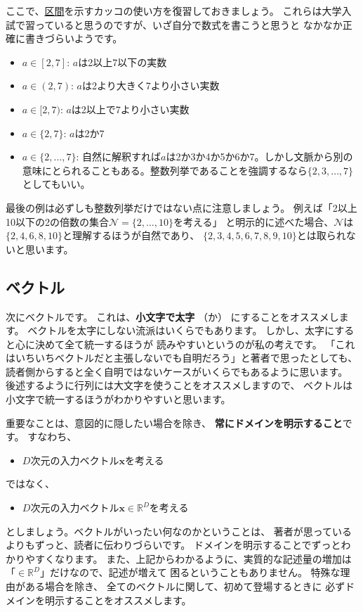 \documentclass[uplatex,twocolumn,9pt,dvipdfmx]{jsarticle}
\begin{document}
ここで、\href{https://en.wikipedia.org/wiki/Interval_(mathematics)}{区間}を示すカッコの使い方を復習しておきましょう。
これらは大学入試で習っていると思うのですが、いざ自分で数式を書こうと思うと
なかなか正確に書きづらいようです。
\begin{itemize}
    \item $a \in [2, 7]$: $a$は2以上7以下の実数
    \item $a \in (2, 7)$: $a$は2より大きく7より小さい実数
    \item $a \in [2, 7)$: $a$は2以上で7より小さい実数
    \item $a \in \{2, 7\}$: $a$は2か7
    \item $a \in \{2, \dots, 7\}$: 自然に解釈すれば$a$は2か3か4か5か6か7。しかし文脈から別の意味にとられることもある。整数列挙であることを強調するなら$\{2, 3, \dots, 7\}$としてもいい。
\end{itemize}
最後の例は必ずしも整数列挙だけではない点に注意しましょう。
例えば「2以上10以下の2の倍数の集合$\mathcal{N}=\{2, \dots, 10\}$を考える」
と明示的に述べた場合、$\mathcal{N}$は$\{2, 4, 6, 8, 10\}$と理解するほうが自然であり、
$\{2, 3, 4, 5, 6, 7, 8, 9, 10\}$とは取られないと思います。

\subsection{ベクトル}
次にベクトルです。
これは、\textbf{小文字で太字}
（\texttt{\mathbf}か\texttt{\bm}）
にすることをオススメします。
ベクトルを太字にしない流派はいくらでもあります。
しかし、太字にすると心に決めて全て統一するほうが
読みやすいというのが私の考えです。
「これはいちいちベクトルだと主張しないでも自明だろう」と著者で思ったとしても、
読者側からすると全く自明ではないケースがいくらでもあるように思います。
後述するように行列には大文字を使うことをオススメしますので、
ベクトルは小文字で統一するほうがわかりやすいと思います。

重要なことは、意図的に隠したい場合を除き、
\textbf{常にドメインを明示すること}です。
すなわち、
\begin{itemize}
\item $D$次元の入力ベクトル$\mathbf{x}$を考える
\end{itemize}
ではなく、
\begin{itemize}
\item $D$次元の入力ベクトル$\mathbf{x}\in\mathbb{R}^D$を考える
\end{itemize}
としましょう。ベクトルがいったい何なのかということは、
著者が思っているよりもずっと、読者に伝わりづらいです。
ドメインを明示することでずっとわかりやすくなります。
また、上記からわかるように、実質的な記述量の増加は
「$\in\mathbb{R}^D$」だけなので、記述が増えて
困るということもありません。
特殊な理由がある場合を除き、
全てのベクトルに関して、初めて登場するときに
必ずドメインを明示することをオススメします。
\end{document}
